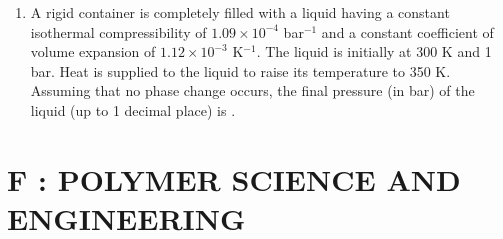 \documentclass[a4paper,10pt]{article}
\begin{document}
\begin{enumerate}
    \item A rigid container is completely filled with a liquid having a constant isothermal compressibility of $1.09 \times 10^{-4}$ bar$^{-1}$ and a constant coefficient of volume expansion of $1.12 \times 10^{-3}$ K$^{-1}$. The liquid is initially at 300 K and 1 bar. Heat is supplied to the liquid to raise its temperature to 350 K. Assuming that no phase change occurs, the final pressure (in bar) of the liquid (up to 1 decimal place) is \underline{\hspace{2cm}}.
    \hfill{}
\end{enumerate}
\clearpage

\section*{F : POLYMER SCIENCE AND ENGINEERING}
\end{document}
